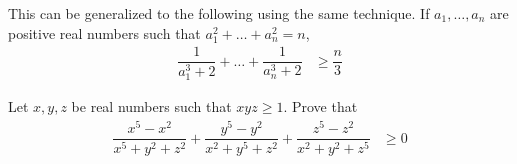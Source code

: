 \documentclass[inequalities.tex]{subfile}
\begin{document}
\begin{problem}[PuMaC $2014$]
				\begin{remark}
					This can be generalized to the following using the same technique. If $a_{1},\ldots,a_{n}$ are positive real numbers such that $a_{1}^{2}+\ldots+a_{n}^{2}=n$,
						\begin{align*}
							\dfrac{1}{a_{1}^{3}+2}+\ldots+\dfrac{1}{a_{n}^{3}+2}
								& \geq \dfrac{n}{3}
						\end{align*}
				\end{remark}
		\end{problem}

		\begin{problem}\label{prob:imo2005-3}
			Let $x,y,z$ be real numbers such that $xyz\geq1$. Prove that
				\begin{align*}
					\dfrac{x^{5}-x^{2}}{x^{5}+y^{2}+z^{2}}+\dfrac{y^{5}-y^{2}}{x^{2}+y^{5}+z^{2}}+\dfrac{z^{5}-z^{2}}{x^{2}+y^{2}+z^{5}}
						& \geq0
				\end{align*}


\end{problem}
\end{document}
